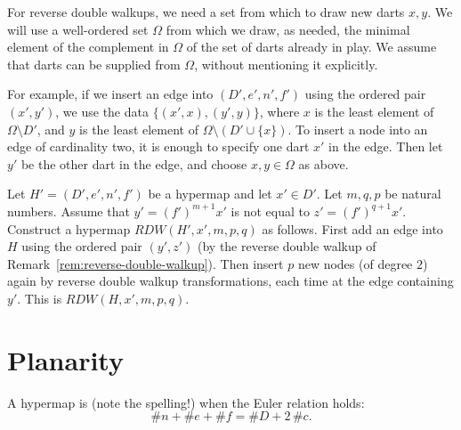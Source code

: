 \begin{remark}\label{rem:dart-universe}
For reverse double walkups, we need a set from which to draw new darts $x,y$.
We will use a well-ordered set $\Omega$ from which we draw, as needed,
the minimal element of the complement in $\Omega$ of the set of darts
already in play.  We assume that darts can be supplied from $\Omega$,
without mentioning it explicitly.  

For example, if we insert an edge into $(D',e',n',f')$
using the
ordered pair $(x',y')$, we use the data $\{(x',x),(y',y)\}$, where $x$ is the
least element of $\Omega\setminus D'$, and $y$ is the least element of
$\Omega\setminus (D'\cup \{x\})$.  To insert a node into an edge of cardinality
two, it is enough to specify one dart $x'$ in the edge.  Then let $y'$ be the other
dart in the edge, and choose $x,y\in \Omega$ as above.
\end{remark}

\begin{definition}[RDW]\label{def:R}  
  Let $H'=(D',e',n',f')$ be a hypermap and let $x'\in D'$.  
Let $m,q,p$ be natural numbers.  Assume that $y' =(f')^{m+1}x'$ is not
equal to $z'=(f')^{q+1}x'$.
Construct a hypermap $RDW(H',x',m,p,q)$  as follows.  
First
  add an edge into $H$ using the ordered pair $(y',z')$
(by the reverse double walkup of
  Remark~\ref{rem:reverse-double-walkup}).  Then insert $p$ new nodes
  (of degree $2$) again by reverse double
  walkup transformations, each time at the edge containing $y'$.  
This is $RDW(H,x',m,p,q)$.
\end{definition}


\section{Planarity}
%
%

\begin{definition}[planar]
A hypermap is  (note the
spelling!) when the Euler relation holds:
\begin{displaymath}\# n + \# e + \# f = \# D + 2\, \#c.\end{displaymath}
%
\end{definition}


